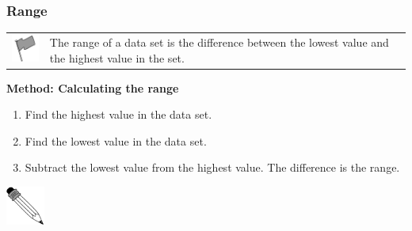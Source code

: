 \begin{description}[noitemsep]
\begin{description}[noitemsep]
            \subsubsection{ Range}
            \nopagebreak
\par
            \label{m39400*fhsst!!!underscore!!!id1566}\begin{definition}
	  \begin{tabular*}{15 cm}{m{15 mm}m{}}
	\hspace*{-50pt}  \includegraphics[width=0.5in]{col11306.imgs/psflag2.png}   & \Definition{   \label{id2622611}\textbf{ Range }} { \label{m39400*meaningfhsst!!!underscore!!!id1566}
          \label{m39400*id212688}The range of a data set is the difference between the lowest value and the highest value in the set. \par 
           } 
      \end{tabular*}
      \end{definition}
          \label{m39400*id212700}
            \textbf{Method: Calculating the range}
          \par 
          \label{m39400*id212707}\begin{enumerate}[noitemsep, label=\textbf{\arabic*}. ] 
            \label{m39400*uid72}\item Find the highest value in the data set.
\label{m39400*uid73}\item Find the lowest value in the data set.
\label{m39400*uid74}\item Subtract the lowest value from the highest value. The difference is the range.
\end{enumerate}
\par
            \label{m39400*secfhsst!!!underscore!!!id1580}\vspace{.5cm} 
      \noindent
      \hspace*{-30pt}\includegraphics[width=0.5in]{col11306.imgs/pspencil2.png}   
\end{description}
\end{description}
